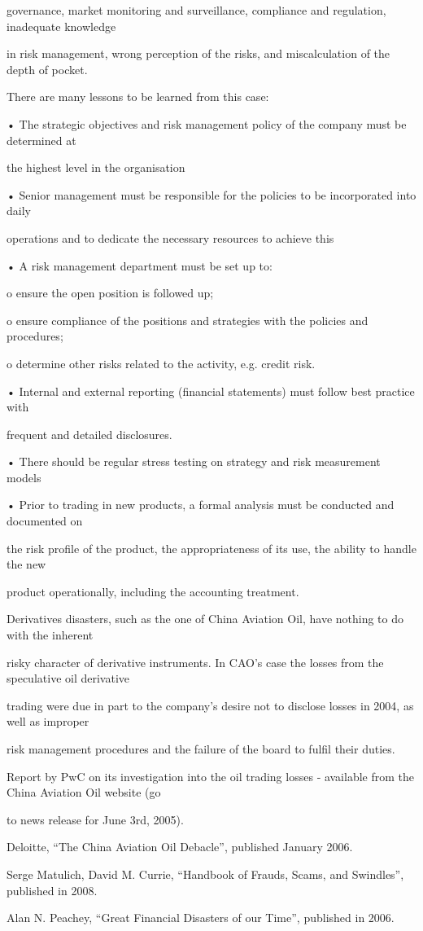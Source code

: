 governance, market monitoring and surveillance, compliance and regulation, inadequate knowledge

in risk management, wrong perception of the risks, and miscalculation of the depth of pocket.

There are many lessons to be learned from this case:

• The strategic objectives and risk management policy of the company must be determined at

the highest level in the organisation

• Senior management must be responsible for the policies to be incorporated into daily

operations and to dedicate the necessary resources to achieve this

• A risk management department must be set up to:

o ensure the open position is followed up;

o ensure compliance of the positions and strategies with the policies and procedures;

o determine other risks related to the activity, e.g. credit risk.

• Internal and external reporting (financial statements) must follow best practice with

frequent and detailed disclosures.

• There should be regular stress testing on strategy and risk measurement models

• Prior to trading in new products, a formal analysis must be conducted and documented on

the risk profile of the product, the appropriateness of its use, the ability to handle the new

product operationally, including the accounting treatment.

Derivatives disasters, such as the one of China Aviation Oil, have nothing to do with the inherent

risky character of derivative instruments. In CAO’s case the losses from the speculative oil derivative

trading were due in part to the company’s desire not to disclose losses in 2004, as well as improper

risk management procedures and the failure of the board to fulfil their duties.

Report by PwC on its investigation into the oil trading losses ‐ available from the China Aviation Oil website  (go

to news release for June 3rd, 2005).

Deloitte, “The China Aviation Oil Debacle”, published January 2006.

Serge Matulich, David M. Currie, “Handbook of Frauds, Scams, and Swindles”, published in 2008.

Alan N. Peachey, “Great Financial Disasters of our Time”, published in 2006.
